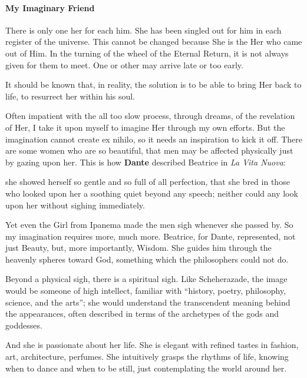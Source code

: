 \paragraph{My Imaginary Friend}
\begin{quotex}
There is only one her for each him. She has been singled out for him in each register of the universe. This cannot be changed because She is the Her who came out of Him. In the turning of the wheel of the Eternal Return, it is not always given for them to meet. One or other may arrive late or too early.

It should be known that, in reality, the solution is to be able to bring Her back to life, to resurrect her within his soul. 

\end{quotex}
Often impatient with the all too slow process, through dreams, of the revelation of Her, I take it upon myself to imagine Her through my own efforts. But the imagination cannot create ex nihilo, so it needs an inspiration to kick it off. There are some women who are so beautiful, that men may be affected physically just by gazing upon her. This is how \textbf{Dante} described Beatrice in \emph{La Vita Nuova}:

\begin{quotex}
she showed herself so gentle and so full of all perfection, that she bred in those who looked upon her a soothing quiet beyond any speech; neither could any look upon her without sighing immediately. 

\end{quotex}
Yet even the Girl from Ipanema made the men sigh whenever she passed by. So my imagination requires more, much more. Beatrice, for Dante, represented, not just Beauty, but, more importantly, Wisdom. She guides him through the heavenly spheres toward God, something which the philosophers could not do.

Beyond a physical sigh, there is a spiritual sigh. Like Scheherazade, the image would be someone of high intellect, familiar with “history, poetry, philosophy, science, and the arts”; she would understand the transcendent meaning behind the appearances, often described in terms of the archetypes of the gods and goddesses.

And she is passionate about her life. She is elegant with refined tastes in fashion, art, architecture, perfumes. She intuitively grasps the rhythms of life, knowing when to dance and when to be still, just contemplating the world around her.

